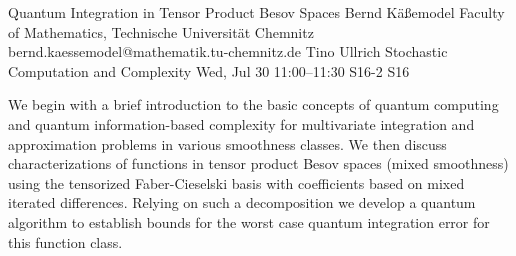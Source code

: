\documentclass[12pt,lettersize,oneside]{book} %
\begin{document}
\begin{talk}
  {Quantum Integration in Tensor Product  Besov Spaces}%
  {Bernd K\"a{\ss}emodel}%
  {Faculty of Mathematics, Technische Universit\"at Chemnitz}%
  {bernd.kaessemodel@mathematik.tu-chemnitz.de}%
  {Tino Ullrich}%
  {Stochastic Computation and Complexity}%
  {Wed, Jul 30 11:00--11:30}%
  {S16-2}%
  {S16}%
    

We begin with a brief introduction to the basic concepts of quantum computing and quantum information-based complexity for multivariate integration and approximation problems in various smoothness classes. We then discuss characterizations of functions in tensor product Besov spaces (mixed smoothness) using the tensorized Faber-Cieselski basis with coefficients based on mixed iterated differences. Relying on such a decomposition we develop a quantum algorithm to establish bounds for the worst case quantum integration error for this function class. 

\medskip
%
%
\end{talk}
\end{document}
